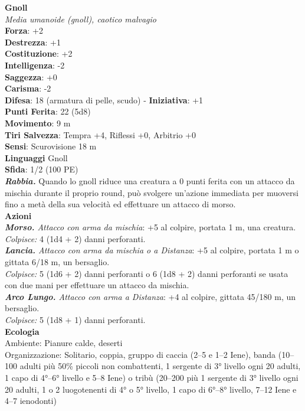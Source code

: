\begin{multicols}{2}
\medskip\textbf{Gnoll}\\
\emph{Media umanoide (gnoll), caotico malvagio}\\
\textbf{Forza}: +2\\
\textbf{Destrezza}: +1\\
\textbf{Costituzione}: +2\\
\textbf{Intelligenza}: -2\\
\textbf{Saggezza}: +0\\
\textbf{Carisma}: -2\\
\textbf{Difesa}: 18 (armatura di pelle, scudo) - \textbf{Iniziativa}: +1\\
\textbf{Punti Ferita}: 22 (5d8)\\
\textbf{Movimento}: 9 m\\
\textbf{Tiri Salvezza}: Tempra +4, Riflessi +0, Arbitrio +0\\
\textbf{Sensi}: Scurovisione 18 m\\
\textbf{Linguaggi} Gnoll\\
\textbf{Sfida}: 1/2 (100 PE)\smallskip\\
\emph{\textbf{Rabbia.}} Quando lo gnoll riduce una creatura a 0 punti ferita con un attacco da mischia durante il proprio round, può svolgere un'azione immediata per muoversi fino a metà della sua velocità ed effettuare un attacco di morso.\\
\smallskip\textbf{Azioni}\\
\emph{\textbf{Morso.} Attacco con arma da mischia}: +5 al colpire, portata 1 m, una creatura.\\
\emph{Colpisce:} 4 (1d4 + 2) danni perforanti.\\
\emph{\textbf{Lancia.} Attacco con arma da mischia o a Distanza}: +5 al colpire, portata 1 m o gittata 6/18 m, un bersaglio.\\
\emph{Colpisce:} 5 (1d6 + 2) danni perforanti o 6 (1d8 + 2) danni perforanti se usata con due mani per effettuare un attacco da mischia.\\
\emph{\textbf{Arco Lungo.} Attacco con arma a Distanza}: +4 al colpire, gittata 45/180 m, un bersaglio.\\
\emph{Colpisce:} 5 (1d8 + 1) danni perforanti.\\
\textbf{Ecologia}\\
Ambiente: Pianure calde, deserti\\
Organizzazione: Solitario, coppia, gruppo di caccia (2–5 e 1–2 Iene), banda (10–100 adulti più 50\% piccoli non combattenti, 1 sergente di 3° livello ogni 20 adulti, 1 capo di 4°–6° livello e 5–8 Iene) o tribù (20–200 più 1 sergente di 3° livello ogni 20 adulti, 1 o 2 luogotenenti di 4° o 5° livello, 1 capo di 6°–8° livello, 7–12 Iene e 4–7 ienodonti)\\

\end{multicols}
